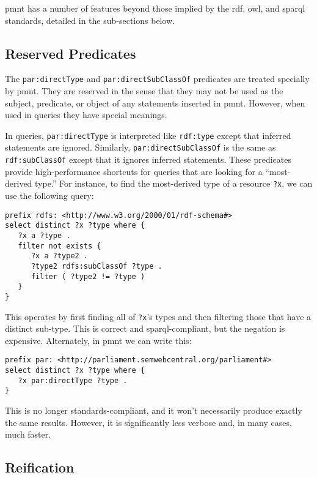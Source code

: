 \ac{pmnt} has a number of features beyond those implied by the \ac{rdf}, \ac{owl}, and \ac{sparql} standards, detailed in the sub-sections below.

\subsection{Reserved Predicates}
\label{section-reserved-predicates}

The \verb|par:directType| and \verb|par:directSubClassOf| predicates are treated specially by \ac{pmnt}.  They are reserved in the sense that they may not be used as the subject, predicate, or object of any  statements inserted in \ac{pmnt}.  However, when used in queries they have special meanings.

In queries, \verb|par:directType| is interpreted like \verb|rdf:type| except that inferred statements are ignored.  Similarly, \verb|par:directSubClassOf| is the same as \verb|rdf:subClassOf| except that it ignores inferred statements.  These predicates provide high-performance shortcuts for queries that are looking for a ``most-derived type.''  For instance, to find the most-derived type of a resource \verb|?x|, we can use the following query:

{\small\begin{verbatim}
prefix rdfs: <http://www.w3.org/2000/01/rdf-schema#>
select distinct ?x ?type where {
   ?x a ?type .
   filter not exists {
      ?x a ?type2 .
      ?type2 rdfs:subClassOf ?type .
      filter ( ?type2 != ?type )
   }
}
\end{verbatim}}

This operates by first finding all of \verb|?x|'s types and then filtering those that have a distinct sub-type.  This is correct and \ac{sparql}-compliant, but the negation is expensive.  Alternately, in \ac{pmnt} we can write this:

{\small\begin{verbatim}
prefix par: <http://parliament.semwebcentral.org/parliament#>
select distinct ?x ?type where {
   ?x par:directType ?type .
}
\end{verbatim}}

This is no longer standards-compliant, and it won't necessarily produce exactly the same results.  However, it is significantly less verbose and, in many cases, much faster.

\subsection{Reification}
\label{section-reification}

